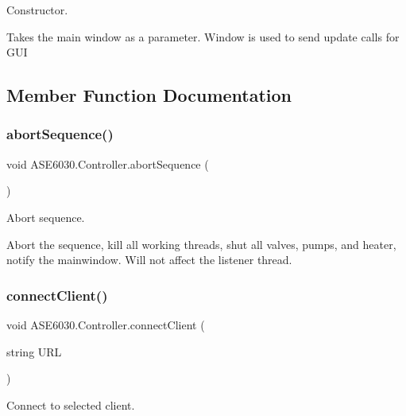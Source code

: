 Constructor. 

Takes the main window as a parameter. Window is used to send update calls for G\+UI 

\subsection{Member Function Documentation}
\mbox{\label{class_a_s_e6030_1_1_controller_a1fa113ab02226c2d8a678365a749e3b0}} 
\subsubsection{\texorpdfstring{abort\+Sequence()}{abortSequence()}}
{\footnotesize\ttfamily void A\+S\+E6030.\+Controller.\+abort\+Sequence (\begin{DoxyParamCaption}{ }\end{DoxyParamCaption})\hspace{0.3cm}{\ttfamily [inline]}}



Abort sequence. 

Abort the sequence, kill all working threads, shut all valves, pumps, and heater, notify the mainwindow. Will not affect the listener thread. \mbox{\label{class_a_s_e6030_1_1_controller_a5f84e69b4885c561df4bc177fcc54d40}} 
\subsubsection{\texorpdfstring{connect\+Client()}{connectClient()}}
{\footnotesize\ttfamily void A\+S\+E6030.\+Controller.\+connect\+Client (\begin{DoxyParamCaption}\item[{string}]{U\+RL }\end{DoxyParamCaption})\hspace{0.3cm}{\ttfamily [inline]}}



Connect to selected client. 

